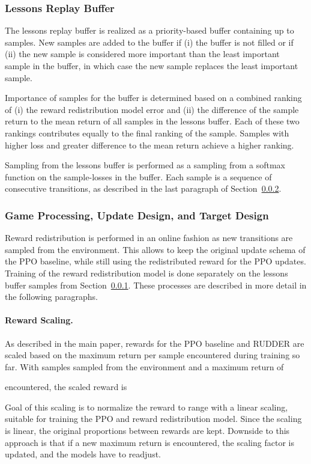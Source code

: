 \documentclass{article}
\begin{document}
\begin{appendices}
\subsubsection{Lessons Replay Buffer}
\label{sec:Alessonbuffer}
The lessons replay buffer is realized as
a priority-based buffer
containing up to  samples.
New samples are added to the buffer if (i) the buffer is not filled or
if (ii) the new sample is considered more important than the least important sample in the buffer,
in which case the new sample replaces the least important sample.

Importance of samples for the buffer is determined based on a combined ranking of
(i) the reward redistribution model error and
(ii) the difference of the sample return to the mean return of all samples in the lessons buffer.
Each of these two rankings contributes equally to the final ranking of the sample. Samples with higher loss and greater difference to the mean return achieve a higher ranking.

Sampling from the lessons buffer is performed as a sampling from a softmax function on the sample-losses in the buffer. Each sample is a sequence of  consecutive transitions, as described in the last paragraph of Section~\ref{sec:Aatari-taupdate}.


\subsubsection{Game Processing, Update Design, and Target Design}\label{sec:Aatari-taupdate}
Reward redistribution is performed in an online fashion as new transitions are sampled from the environment. This allows to keep the original update schema of the PPO baseline, while still using the redistributed reward for the PPO updates. Training of the reward redistribution model is done separately on the lessons buffer samples from Section~\ref{sec:Alessonbuffer}. These processes are described in more detail in the following paragraphs.


\paragraph{Reward Scaling.}
As described in the main paper,
rewards for the PPO baseline and RUDDER are scaled based on the maximum return per sample encountered during training so far.
With  samples sampled from the environment
and a maximum return of

encountered, the scaled reward  is


Goal of this scaling is to normalize the reward  to range  
with a linear scaling, suitable for training the PPO and reward redistribution model.
Since the scaling is linear, the original proportions between rewards are kept.
Downside to this approach is that if a new
maximum return is encountered,
the scaling factor is updated, and the models have to readjust.


\end{appendices}
\end{document}
